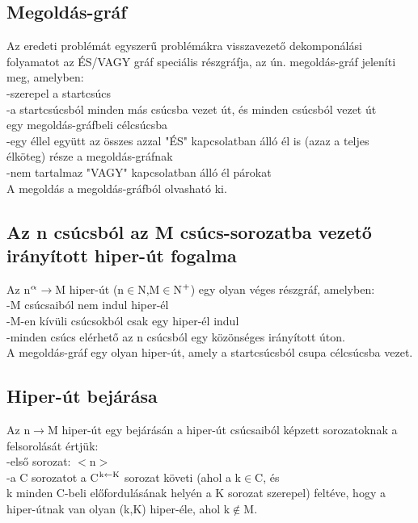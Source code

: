 \documentclass{article}
\begin{document}
	 \subsection{Megoldás-gráf}
	 Az eredeti problémát egyszerű problémákra visszavezető dekomponálási folyamatot az ÉS/VAGY gráf speciális részgráfja, az ún. megoldás-gráf jeleníti meg, amelyben:\\
	 \hspace*{1em} -szerepel a startcsúcs\\
	 \hspace*{1em} -a startcsúcsból minden más csúcsba vezet út, és minden csúcsból vezet út\\
	 \hspace*{1em} egy megoldás-gráfbeli célcsúcsba\\
	 \hspace*{1em} -egy éllel együtt az összes azzal "ÉS" kapcsolatban álló él is (azaz a teljes\\
	 \hspace*{1em} élköteg) része a megoldás-gráfnak\\
	 \hspace*{1em} -nem tartalmaz "VAGY" kapcsolatban álló él párokat\\
	 A megoldás a megoldás-gráfból olvasható ki.
	 
	 \subsection{Az n csúcsból az M csúcs-sorozatba vezető irányított hiper-út fogalma}
	 Az n$\textsuperscript{$\alpha$}$$\rightarrow$M hiper-út (n$\in$N,M$\in$N$\textsuperscript{+}$) egy olyan véges részgráf, amelyben:\\
	 \hspace*{1em}-M csúcsaiból nem indul hiper-él\\
	 \hspace*{1em}-M-en kívüli csúcsokból csak egy hiper-él indul\\
	 \hspace*{1em}-minden csúcs elérhető az n csúcsból egy közönséges irányított úton.\\
	 A megoldás-gráf egy olyan hiper-út, amely a startcsúcsból csupa célcsúcsba vezet.
	 
	 \newpage
	 \subsection{Hiper-út bejárása}
	 Az n$\rightarrow$M hiper-út egy bejárásán a hiper-út csúcsaiból képzett sorozatoknak a felsorolását értjük:\\
	 \hspace*{1em} -első sorozat: $<$n$>$\\
	 \hspace*{1em} -a C sorozatot a C$\textsuperscript{k$\leftarrow$K}$ sorozat követi (ahol a k$\in$C, és\\
	 \hspace*{1em} k minden C-beli előfordulásának helyén a K sorozat szerepel) feltéve, hogy a\\
	 \hspace*{1em} hiper-útnak van olyan (k,K) hiper-éle, ahol k$\notin$M.\\
	 
\end{document}
